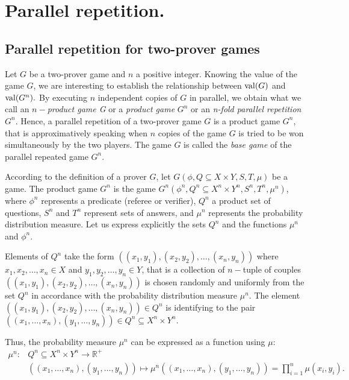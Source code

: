 \section{Parallel repetition.}

\subsection{Parallel repetition for  two-prover games}

Let $G$ be a two-prover game and $n$ a positive integer. Knowing the value of the game $G$, we are interesting to establish the relationship between $\mathrm{val} (G)$ and $\mathrm{val} (G^n).$  By executing  $n$ independent copies of $G$ in parallel, we obtain what we call an $n-$\textit{product game G} or a \textit{product game} $G^n$ or an \textit{n-fold parallel repetition} $G^n.$ Hence, a parallel repetition of a two-prover game $G$ is a product game $G^n$, that is approximatively speaking when $n$ copies of the game $G$ is tried to be won simultaneously by the two players. The game $G$ is called  the \textit{base game} of the parallel repeated game $G^n.$

According to the definition of a prover $G$, let $G(\phi, Q \subseteq X \times Y, S, T, \mu)$ be a game. The product game $G^n$ is the game $G^n(\phi^n, Q^n\subseteq X^n \times Y^n, S^n, T^n, \mu^n)$, where $\phi^n$ represents a predicate (referee or verifier), $Q^n$ a product set of questions, $S^n$ and $T^n$ represent sets of answers, and $\mu^n$ represents the probability distribution measure. Let us express explicitly the sets $Q^n$ and the functions $\mu^n$ and $\phi^n.$

 Elements of $Q^n$ take the form $((x_1, y_1),(x_2,y_2 ), \ldots, (x_n, y_n))$ where $x_1, x_2, \ldots, x_n \in X$ and $y_1, y_2, \ldots, y_n \in Y$, that is a collection of $n-$tuple of couples  $((x_1, y_1),(x_2,y_2 ), \ldots, (x_n, y_n))$ is chosen randomly and uniformly from the set $Q^n$ in accordance with the probability distribution measure $\mu^n $. The element  $((x_1, y_1),(x_2,y_2 ), \ldots, (x_n, y_n)) \in Q^n$ is identifying to the pair $((x_1,\ldots, x_n), (y_1, \ldots, y_n)) \in Q^n \subseteq X^n \times Y^n.$
 
Thus, the probability measure $\mu^n$ can be expressed as a function using $\mu$: 
 \begin{align*}
\mu^n:  & Q^n \subseteq X^n \times Y^n  \longrightarrow \mathbb{R}^+ \\
  & ((x_1,\ldots, x_n), (y_1,\ldots, y_n)) \longmapsto \mu^n((x_1,\ldots, x_n), (y_1,\ldots, y_n))=\prod_{i=1}^n  \mu (x_i, y_i). 
 \end{align*}
 
